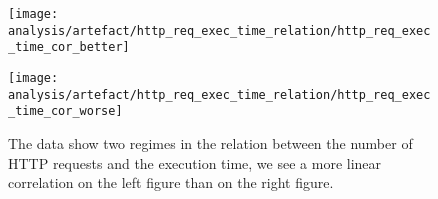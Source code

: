 \begin{figure}[htbp]
    \centering
    \begin{minipage}[t]{0.45\linewidth}
        \centering
        \texttt{[image: analysis/artefact/http\_req\_exec\_time\_relation/http\_req\_exec\_time\_cor\_better]}
        \label{fig:http_req_exec_time_cor_better}
    \end{minipage}
    \hspace{0.05\textwidth}
    \begin{minipage}[t]{0.45\linewidth}
        \centering
        \texttt{[image: analysis/artefact/http\_req\_exec\_time\_relation/http\_req\_exec\_time\_cor\_worse]}
        \label{fig:http_req_exec_time_cor_worse}
    \end{minipage}

    \caption{
        The data show two regimes in the relation between the number of HTTP requests and the execution time, 
        we see a more linear correlation on the left figure than on the right figure.
        }
    \label{fig:http_req_exec_time_cor}
\end{figure}

